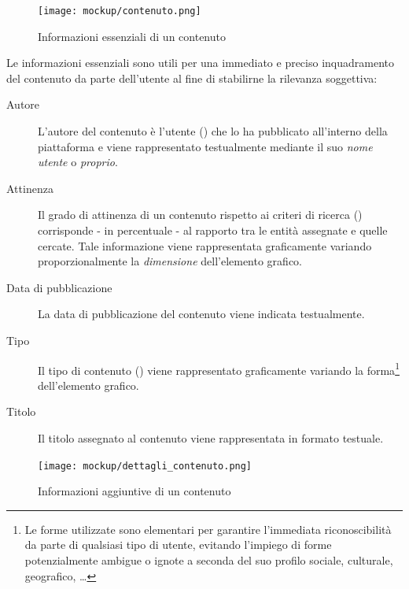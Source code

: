 \documentclass[10pt,a4paper,headinclude,footinclude,hidelinks]{scrreprt} %
\begin{document}
	\begin{figure}[ht]
		\begin{center}
	    	\texttt{[image: mockup/contenuto.png]}
			\label{gfx:mockup:content}
			\caption{Informazioni essenziali di un contenuto}
		\end{center}
	\end{figure}

	Le informazioni essenziali sono utili per una immediato e preciso inquadramento del contenuto da parte dell'utente al fine di stabilirne la rilevanza soggettiva:
	\begin{description}
	\item[Autore] L'autore del contenuto è l'utente (\textit{}) che lo ha pubblicato all'interno della piattaforma e viene rappresentato testualmente mediante il suo \textit{nome utente} o \textit{proprio}.
	\item[Attinenza] Il grado di attinenza di un contenuto rispetto ai criteri di ricerca (\textit{}) corrisponde - in percentuale - al rapporto tra le entità assegnate e quelle cercate. Tale informazione viene rappresentata graficamente variando proporzionalmente la \textit{dimensione} dell'elemento grafico.
	\item[Data di pubblicazione] La data di pubblicazione del contenuto viene indicata testualmente.
	\item[Tipo] Il tipo di contenuto (\textit{}) viene rappresentato graficamente variando la forma\footnote{Le forme utilizzate sono elementari per garantire l'immediata riconoscibilità da parte di qualsiasi tipo di utente, evitando l'impiego di forme potenzialmente ambigue o ignote a seconda del suo profilo sociale, culturale, geografico, \ldots} dell'elemento grafico.
	\item[Titolo] Il titolo assegnato al contenuto viene rappresentata in formato testuale.
	\end{description}

	\begin{figure}[ht]
		\begin{center}
	    	\texttt{[image: mockup/dettagli\_contenuto.png]}
			\label{gfx:mockup:content-details}
			\caption{Informazioni aggiuntive di un contenuto}
		\end{center}
	\end{figure}
\end{document}
